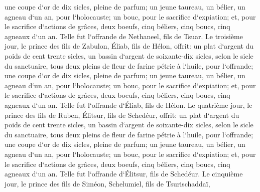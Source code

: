\verse une coupe d`or de dix sicles, pleine de parfum; 
\verse un jeune taureau, un bélier, un agneau d`un an, pour l`holocauste; 
\verse un bouc, pour le sacrifice d`expiation; 
\verse et, pour le sacrifice d`actions de grâces, deux boeufs, cinq béliers, cinq boucs, cinq agneaux d`un an. Telle fut l`offrande de Nethaneel, fils de Tsuar. 
\verse Le troisième jour, le prince des fils de Zabulon, Éliab, fils de Hélon, 
\verse offrit: un plat d`argent du poids de cent trente sicles, un bassin d`argent de soixante-dix sicles, selon le sicle du sanctuaire, tous deux pleins de fleur de farine pétrie à l`huile, pour l`offrande; 
\verse une coupe d`or de dix sicles, pleine de parfum; 
\verse un jeune taureau, un bélier, un agneau d`un an, pour l`holocauste; 
\verse un bouc, pour le sacrifice d`expiation; 
\verse et, pour le sacrifice d`actions de grâces, deux boeufs, cinq béliers, cinq boucs, cinq agneaux d`un an. Telle fut l`offrande d`Éliab, fils de Hélon. 
\verse Le quatrième jour, le prince des fils de Ruben, Élitsur, fils de Schedéur, 
\verse offrit: un plat d`argent du poids de cent trente sicles, un bassin d`argent de soixante-dix sicles, selon le sicle du sanctuaire, tous deux pleins de fleur de farine pétrie à l`huile, pour l`offrande; 
\verse une coupe d`or de dix sicles, pleine de parfum; 
\verse un jeune taureau, un bélier, un agneau d`un an, pour l`holocauste; 
\verse un bouc, pour le sacrifice d`expiation; 
\verse et, pour le sacrifice d`actions de grâces, deux boeufs, cinq béliers, cinq boucs, cinq agneaux d`un an. Telle fut l`offrande d`Élitsur, fils de Schedéur. 
\verse Le cinquième jour, le prince des fils de Siméon, Schelumiel, fils de Tsurischaddaï, 
